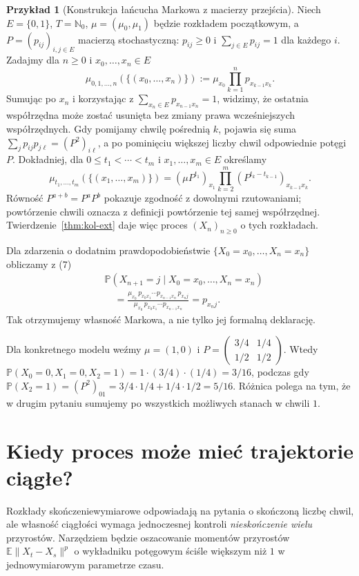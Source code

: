 \documentclass[11pt,a4paper,oneside]{report}
\numberwithin{equation}{chapter}
\theoremstyle{plain}
\theoremstyle{definition}
\newtheorem{przyklad}{Przykład}[chapter]
\theoremstyle{remark}
\newcommand{\N}{\mathbb{N}}
\newcommand{\Prob}{\mathbb{P}}
\newcommand{\E}{\mathbb{E}}
\newcommand{\norm}[1]{\lVert #1\rVert}
\begin{document}
\begin{przyklad}[Konstrukcja łańcucha Markowa z macierzy przejścia]
Niech $E=\{0,1\}$, $T=\N_0$, $\mu=(\mu_0,\mu_1)$
będzie rozkładem początkowym, a
$P=(p_{ij})_{i,j\in E}$ macierzą stochastyczną:
$p_{ij}\ge0$ i $\sum_{j\in E}p_{ij}=1$ dla każdego $i$.
Zadajmy dla $n\ge0$ i $x_0,\ldots,x_n\in E$
\[
\mu_{0,1,\ldots,n}(\{(x_0,\ldots,x_n)\})
:=\mu_{x_0}\prod_{k=1}^n p_{x_{k-1}x_k}.
\tag{7}
\]
Sumując po $x_n$ i korzystając z
$\sum_{x_n\in E}p_{x_{n-1}x_n}=1$, widzimy,
że ostatnia współrzędna może zostać usunięta
bez zmiany prawa wcześniejszych współrzędnych.
Gdy pomijamy chwilę pośrednią $k$, pojawia się suma
$\sum_j p_{ij}p_{j\ell}=(P^2)_{i\ell}$,
a po pominięciu większej liczby chwil
odpowiednie potęgi $P$.
Dokładniej, dla $0\le t_1<\cdots<t_m$ i
$x_1,\ldots,x_m\in E$ określamy
\[
\mu_{t_1,\ldots,t_m}(\{(x_1,\ldots,x_m)\})
=(\mu P^{t_1})_{x_1}
\prod_{k=2}^m (P^{t_k-t_{k-1}})_{x_{k-1}x_k}.
\]
Równość $P^{a+b}=P^aP^b$ pokazuje zgodność
z dowolnymi rzutowaniami; powtórzenie chwili
oznacza z definicji powtórzenie tej samej współrzędnej.
Twierdzenie~\ref{thm:kol-ext} daje więc proces
$(X_n)_{n\ge0}$ o tych rozkładach.

Dla zdarzenia o dodatnim prawdopodobieństwie
$\{X_0=x_0,\ldots,X_n=x_n\}$ obliczamy z (7)
\[
\begin{aligned}
&\Prob(X_{n+1}=j\mid X_0=x_0,\ldots,X_n=x_n)\\
&\quad=\frac{\mu_{x_0}\,p_{x_0x_1}\cdots
p_{x_{n-1}x_n}\,p_{x_nj}}
{\mu_{x_0}\,p_{x_0x_1}\cdots p_{x_{n-1}x_n}}
=p_{x_nj}.
\end{aligned}
\]
Tak otrzymujemy własność Markowa, a nie tylko
jej formalną deklarację.

Dla konkretnego modelu weźmy
$\mu=(1,0)$ i
$P=\begin{pmatrix}3/4&1/4\\1/2&1/2\end{pmatrix}$.
Wtedy $\Prob(X_0=0,X_1=0,X_2=1)
=1\cdot(3/4)\cdot(1/4)=3/16$, podczas gdy
$\Prob(X_2=1)=(P^2)_{01}
=3/4\cdot1/4+1/4\cdot1/2=5/16$.
Różnica polega na tym, że w drugim pytaniu
sumujemy po wszystkich możliwych stanach w chwili $1$.
\end{przyklad}

\section{Kiedy proces może mieć trajektorie ciągłe?}
Rozkłady skończeniewymiarowe odpowiadają na pytania o
skończoną liczbę chwil, ale własność ciągłości wymaga
jednoczesnej kontroli \emph{nieskończenie wielu} przyrostów.
Narzędziem będzie oszacowanie momentów przyrostów
$\E\norm{X_t-X_s}^p$ o wykładniku potęgowym ściśle
większym niż $1$ w jednowymiarowym parametrze czasu.
\end{document}
